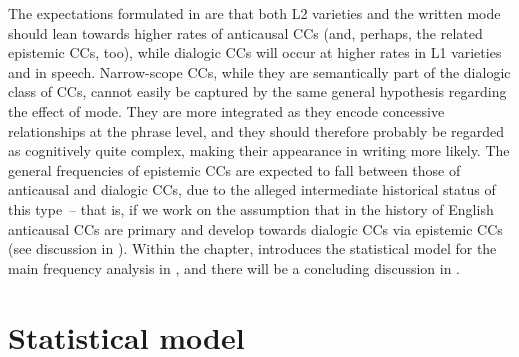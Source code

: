 The expectations formulated in  are that both L2 varieties and the written mode should lean towards higher rates of anticausal CCs (and, perhaps, the related epistemic CCs, too), while dialogic CCs will occur at higher rates in L1 varieties and in speech. Narrow-scope CCs, while they are semantically part of the dialogic class of CCs, cannot easily be captured by the same general hypothesis regarding the effect of mode. They are more integrated as they encode concessive relationships at the phrase level, and they should therefore probably be regarded as cognitively quite complex, making their appearance in writing more likely. The general frequencies of epistemic CCs are expected to fall between those of anticausal and dialogic CCs, due to the alleged intermediate historical status of this type~– that is, if we work on the assumption that in the history of English anticausal CCs are primary and develop towards dialogic CCs via epistemic CCs (see discussion in \citealt{Sweetser1990}). Within the chapter,  introduces the statistical model for the main frequency analysis in , and there will be a concluding discussion in .

\section{\label{bkm:Ref52538317}Statistical model}\label{sec:8.1}

